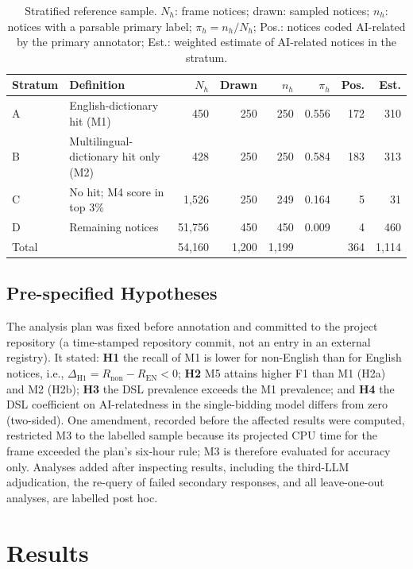 \documentclass[runningheads]{llncs}
\begin{document}
\begin{table}[t]
\caption{Stratified reference sample. $N_h$: frame notices; drawn: sampled notices; $n_h$: notices with a parsable primary label; $\pi_h=n_h/N_h$; Pos.: notices coded AI-related by the primary annotator; Est.: weighted estimate of AI-related notices in the stratum.}\label{tab:design}
\centering
\begin{tabular}{llrrrrrr}
\toprule
Stratum & Definition & $N_h$ & Drawn & $n_h$ & $\pi_h$ & Pos. & Est. \\
\midrule
A & English-dictionary hit (M1) & 450 & 250 & 250 & 0.556 & 172 & 310 \\
B & Multilingual-dictionary hit only (M2) & 428 & 250 & 250 & 0.584 & 183 & 313 \\
C & No hit; M4 score in top 3\% & 1,526 & 250 & 249 & 0.164 & 5 & 31 \\
D & Remaining notices & 51,756 & 450 & 450 & 0.009 & 4 & 460 \\
\midrule
Total & & 54,160 & 1,200 & 1,199 & & 364 & 1,114 \\
\bottomrule
\end{tabular}
\end{table}

\subsection{Pre-specified Hypotheses}
The analysis plan was fixed before annotation and committed to the project repository %
(a time-stamped repository commit, not an entry in an external registry). It stated: \textbf{H1} the recall of M1 is lower for non-English than for English notices, i.e., $\Delta_{\mathrm{H1}}=R_{\mathrm{non}}-R_{\mathrm{EN}}<0$; \textbf{H2} M5 attains higher F1 than M1 (H2a) and M2 (H2b); \textbf{H3} the DSL prevalence exceeds the M1 prevalence; and \textbf{H4} the DSL coefficient on AI-relatedness in the single-bidding model differs from zero (two-sided). One amendment, recorded before the affected results were computed, restricted M3 to the labelled sample because its projected CPU time for the frame exceeded the plan's six-hour rule; M3 is therefore evaluated for accuracy only. Analyses added after inspecting results, including the third-LLM adjudication, the re-query of failed secondary responses, and all leave-one-out analyses, are labelled post hoc.

\section{Results}
\end{document}
